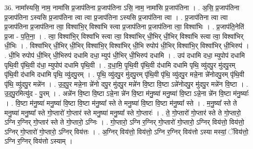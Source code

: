 \documentclass[17pt]{extarticle}
\begin{document}
36. नामा᳚स्यसि॒ नाम॒ नामा॑सि प्र॒जाप॑तिना प्र॒जाप॑तिना ऽसि॒ नाम॒ नामा॑सि प्र॒जाप॑तिना । . अ॒सि॒ प्र॒जाप॑तिना प्र॒जाप॑तिना ऽस्यसि प्र॒जाप॑तिना त्वा त्वा प्र॒जाप॑तिना ऽस्यसि प्र॒जाप॑तिना त्वा । . प्र॒जाप॑तिना त्वा त्वा प्र॒जाप॑तिना प्र॒जाप॑तिना त्वा॒ विश्वा॑भि॒र् विश्वा॑भि स्त्वा प्र॒जाप॑तिना प्र॒जाप॑तिना त्वा॒ विश्वा॑भिः । . प्र॒जाप॑ति॒नेति॑ प्र॒जा - प॒ति॒ना॒ । . त्वा॒ विश्वा॑भि॒र् विश्वा॑भि स्त्वा त्वा॒ विश्वा॑भिर् धी॒भिर् धी॒भिर् विश्वा॑भि स्त्वा त्वा॒ विश्वा॑भिर् धी॒भिः । . विश्वा॑भिर् धी॒भिर् धी॒भिर् विश्वा॑भि॒र् विश्वा॑भिर् धी॒भि रुपोप॑ धी॒भिर् विश्वा॑भि॒र् विश्वा॑भिर् धी॒भिरुप॑ । . धी॒भि रुपोप॑ धी॒भिर् धी॒भिरुप॑ दधामि दधा॒ म्युप॑ धी॒भिर् धी॒भिरुप॑ दधामि । . उप॑ दधामि दधा॒ म्युपोप॑ दधामि पृथि॒वी पृ॑थि॒वी द॑धा॒ म्युपोप॑ दधामि पृथि॒वी । . द॒धा॒मि॒ पृ॒थि॒वी पृ॑थि॒वी द॑धामि दधामि पृथि॒ व्यु॑दपु॒र मु॑दपु॒रम् पृ॑थि॒वी द॑धामि दधामि पृथि॒ व्यु॑दपु॒रम् । . पृ॒थि॒ व्यु॑दपु॒र मु॑दपु॒रम् पृ॑थि॒वी पृ॑थि॒ व्यु॑दपु॒र मन्ने॒ना न्ने॑नोदपु॒रम् पृ॑थि॒वी पृ॑थि॒ व्यु॑दपु॒र मन्ने॑न । . उ॒द॒पु॒र मन्ने॒ना न्ने॑नो दपु॒र मु॑दपु॒र मन्ने॑न वि॒ष्टा वि॒ष्टा ऽन्ने॑नोदपु॒र मु॑दपु॒र मन्ने॑न वि॒ष्टा । . उ॒द॒पु॒रमित्यु॑द - पु॒रम् । . अन्ने॑न वि॒ष्टा वि॒ष्टा ऽन्ने॒ना न्ने॑न वि॒ष्टा म॑नु॒ष्या॑ मनु॒ष्या॑ वि॒ष्टा ऽन्ने॒ना न्ने॑न वि॒ष्टा म॑नु॒ष्याः᳚ । . वि॒ष्टा म॑नु॒ष्या॑ मनु॒ष्या॑ वि॒ष्टा वि॒ष्टा म॑नु॒ष्या᳚ स्ते ते मनु॒ष्या॑ वि॒ष्टा वि॒ष्टा म॑नु॒ष्या᳚ स्ते । . म॒नु॒ष्या᳚ स्ते ते मनु॒ष्या॑ मनु॒ष्या᳚ स्ते गो॒प्तारो॑ गो॒प्तार॑ स्ते मनु॒ष्या॑ मनु॒ष्या᳚ स्ते गो॒प्तारः॑ । . ते॒ गो॒प्तारो॑ गो॒प्तार॑ स्ते ते गो॒प्तारो॒ ऽग्नि र॒ग्निर् गो॒प्तार॑ स्ते ते गो॒प्तारो॒ ऽग्निः । . गो॒प्तारो॒ ऽग्नि र॒ग्निर् गो॒प्तारो॑ गो॒प्तारो॒ ऽग्निर् विय॑त्तो॒ विय॑त्तो॒ ऽग्निर् गो॒प्तारो॑ गो॒प्तारो॒ ऽग्निर् विय॑त्तः । . अ॒ग्निर् विय॑त्तो॒ विय॑त्तो॒ ऽग्नि र॒ग्निर् विय॑त्तो ऽस्या मस्यां॒ ॅविय॑त्तो॒ ऽग्नि र॒ग्निर् विय॑त्तो ऽस्याम् । \newline
\end{document}
